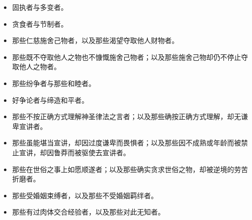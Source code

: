 \begin{itemize}
\item 固执者与多变者。
\end{itemize}

\begin{itemize}
\item 贪食者与节制者。
\end{itemize}

\begin{itemize}
\item 那些仁慈施舍己物者，以及那些渴望夺取他人财物者。
\end{itemize}

\begin{itemize}
\item 那些既不夺取他人之物也不慷慨施舍己物者；以及那些施舍己物却仍不停止夺取他人之物者。
\end{itemize}

\begin{itemize}
\item 那些纷争者与那些和睦者。
\end{itemize}

\begin{itemize}
\item 好争论者与缔造和平者。
\end{itemize}

\begin{itemize}
\item 那些不按正确方式理解神圣律法之言者；以及那些确按正确方式理解，却无谦卑宣讲者。
\end{itemize}

\begin{itemize}
\item 那些虽能堪当宣讲，却因过度谦卑而畏惧者；以及那些因不成熟或年龄而被禁止宣讲，却因鲁莽而被驱使去宣讲者。
\end{itemize}

\begin{itemize}
\item 那些在世俗之事上如愿顺遂者；以及那些确实贪求世俗之物，却被逆境的劳苦折磨者。
\end{itemize}

\begin{itemize}
\item 那些受婚姻束缚者，以及那些不受婚姻羁绊者。
\end{itemize}

\begin{itemize}
\item 那些有过肉体交合经验者，以及那些对此无知者。
\end{itemize}

